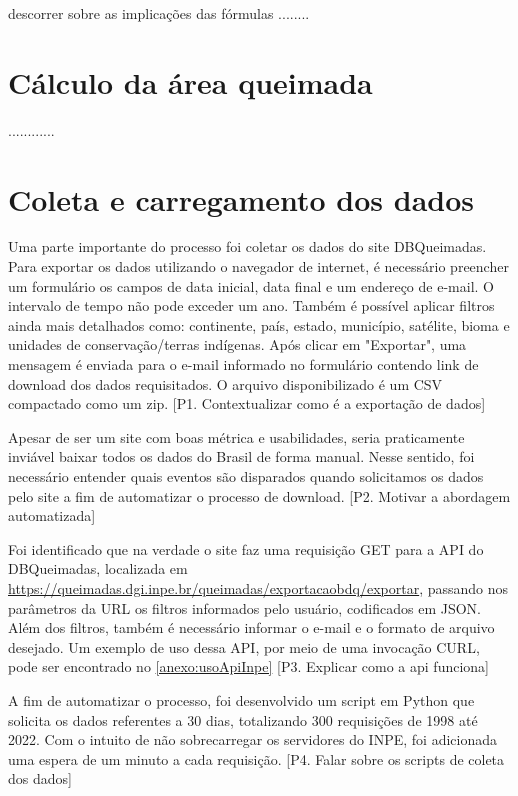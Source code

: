 \documentclass[cic,tc]{iiufrgs}
\begin{document}
descorrer sobre as implicações das fórmulas ........

\section{Cálculo da área queimada}

............


\section{Coleta e carregamento dos dados}

Uma parte importante do processo foi coletar os dados do site DBQueimadas. 
Para exportar os dados utilizando o navegador de internet, é necessário 
preencher um formulário os campos de data inicial,
data final e um endereço de e-mail. O intervalo de tempo não 
pode exceder um ano. Também é possível aplicar filtros ainda mais 
detalhados como: continente, país, estado, município, satélite, bioma e 
unidades de conservação/terras indígenas. Após clicar em "Exportar", 
uma mensagem é enviada para o e-mail informado no formulário contendo link de 
download dos dados requisitados. O arquivo disponibilizado é um CSV compactado 
como um zip. [P1. Contextualizar como é a exportação de dados]\par

Apesar de ser um site com boas métrica e usabilidades, seria praticamente 
inviável baixar todos os dados do Brasil de forma manual. Nesse sentido, 
foi necessário entender quais eventos são disparados quando solicitamos 
os dados pelo site a fim de automatizar o processo de download. 
[P2. Motivar a abordagem automatizada] \par

Foi identificado que na verdade o site faz uma requisição GET para a API do 
DBQueimadas, localizada em 
\url{https://queimadas.dgi.inpe.br/queimadas/exportacaobdq/exportar}, 
passando nos parâmetros da URL os filtros informados pelo usuário, codificados 
em JSON. Além dos filtros, também é necessário informar o e-mail e o formato 
de arquivo desejado. Um exemplo de uso dessa API, por meio de uma invocação CURL, 
pode ser encontrado no \ref{anexo:usoApiInpe} [P3. Explicar como a api funciona]

A fim de automatizar o processo, foi desenvolvido um script em Python que 
solicita os dados referentes a 30 dias, totalizando 300 requisições de 1998 
até 2022. Com 
o intuito de não sobrecarregar os servidores do INPE, foi adicionada uma espera de 
um minuto a cada requisição. [P4. Falar sobre os scripts de coleta dos dados] \par
\end{document}
